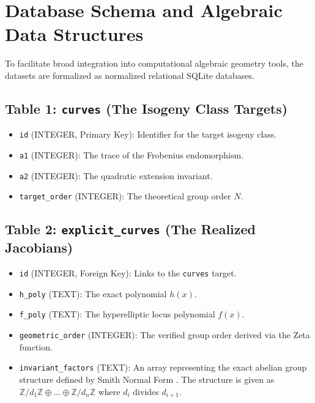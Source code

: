 \documentclass[12pt]{article}
\begin{document}
\section{Database Schema and Algebraic Data Structures}
To facilitate broad integration into computational algebraic geometry tools, the datasets are formalized as normalized relational SQLite databases. 

\subsection{Table 1: \texttt{curves} (The Isogeny Class Targets)}
\begin{itemize}
    \item \texttt{id} (INTEGER, Primary Key): Identifier for the target isogeny class.
    \item \texttt{a1} (INTEGER): The trace of the Frobenius endomorphism.
    \item \texttt{a2} (INTEGER): The quadratic extension invariant.
    \item \texttt{target\_order} (INTEGER): The theoretical group order $N$.
\end{itemize}

\subsection{Table 2: \texttt{explicit\_curves} (The Realized Jacobians)}
\begin{itemize}
    \item \texttt{id} (INTEGER, Foreign Key): Links to the \texttt{curves} target.
    \item \texttt{h\_poly} (TEXT): The exact polynomial $h(x)$.
    \item \texttt{f\_poly} (TEXT): The hyperelliptic locus polynomial $f(x)$.
    \item \texttt{geometric\_order} (INTEGER): The verified group order derived via the Zeta function.
    \item \texttt{invariant\_factors} (TEXT): An array representing the exact abelian group structure defined by Smith Normal Form \cite{Smith1861}. The structure is given as $\mathbb{Z}/d_1\mathbb{Z} \oplus \dots \oplus \mathbb{Z}/d_n\mathbb{Z}$ where $d_i$ divides $d_{i+1}$.
\end{itemize}
\end{document}
